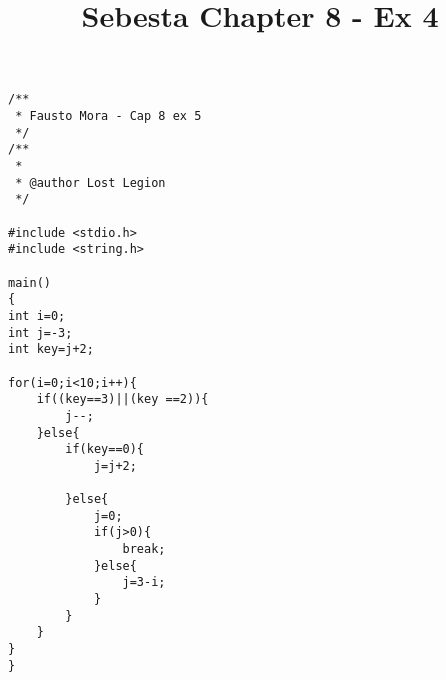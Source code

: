 \documentclass{article}
\begin{document}
\lstset{language=C}          %
\title{Sebesta Chapter 8 - Ex 4}
\begin{lstlisting}[frame=single]  % Start your code-block
/**
 * Fausto Mora - Cap 8 ex 5
 */
/**
 *
 * @author Lost Legion
 */

#include <stdio.h>
#include <string.h>

main()
{
int i=0;
int j=-3;
int key=j+2;

for(i=0;i<10;i++){
    if((key==3)||(key ==2)){
		j--;
	}else{
		if(key==0){
			j=j+2;
		
		}else{
			j=0;
			if(j>0){
				break;
			}else{
				j=3-i;
			}
		}
	}		
}
}

\end{lstlisting}
\end{document}
